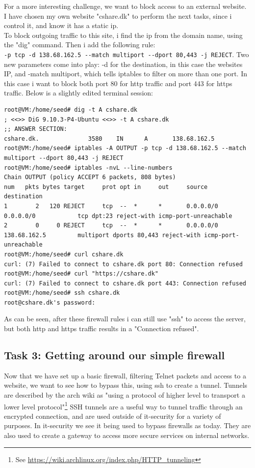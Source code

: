 \documentclass{article}
\begin{document}
For a more interesting challenge, we want to block access to an external website.
I have chosen my own website "cshare.dk" to perform the next tasks, since i control
it, and know it has a static ip.\\
To block outgoing traffic to this site, i find the ip from the domain name, using
the "dig" command. Then i add the following rule:\\
\verb!-p tcp -d 138.68.162.5 --match multiport --dport 80,443 -j REJECT!. Two new
parameters come into play: -d for the destination, in this case the websites IP, and
-match multiport, which tells iptables to filter on more than one port. In this case
i want to block both port 80 for http traffic and port 443 for https traffic. Below
is a slightly edited terminal session:
\begin{verbatim}
root@VM:/home/seed# dig -t A cshare.dk
; <<>> DiG 9.10.3-P4-Ubuntu <<>> -t A cshare.dk
;; ANSWER SECTION:
cshare.dk.              3580    IN      A       138.68.162.5
root@VM:/home/seed# iptables -A OUTPUT -p tcp -d 138.68.162.5 --match multiport --dport 80,443 -j REJECT
root@VM:/home/seed# iptables -nvL --line-numbers
Chain OUTPUT (policy ACCEPT 6 packets, 808 bytes)
num   pkts bytes target     prot opt in     out     source               destination
1        2   120 REJECT     tcp  --  *      *       0.0.0.0/0            0.0.0.0/0            tcp dpt:23 reject-with icmp-port-unreachable
2        0     0 REJECT     tcp  --  *      *       0.0.0.0/0            138.68.162.5         multiport dports 80,443 reject-with icmp-port-unreachable
root@VM:/home/seed# curl cshare.dk
curl: (7) Failed to connect to cshare.dk port 80: Connection refused
root@VM:/home/seed# curl "https://cshare.dk"
curl: (7) Failed to connect to cshare.dk port 443: Connection refused
root@VM:/home/seed# ssh cshare.dk
root@cshare.dk's password:
\end{verbatim}
As can be seen, after these firewall rules i can still use "ssh" to access the server,
but both http and https traffic results in a "Connection refused".\\


\subsection{Task 3: Getting around our simple firewall}
Now that we have set up a basic firewall, filtering Telnet packets and access to
a website, we want to see how to bypass this, using ssh to create a tunnel. 
Tunnels are described by the arch wiki as "using a protocol of higher level 
to transport a lower level protocol"\footnote{See \url{https://wiki.archlinux.org/index.php/HTTP_tunneling}}
SSH tunnels are a useful way to tunnel traffic through an encrypted connection, and
are used outside of it-security for a variety of purposes. In it-security we see
it being used to bypass firewalls as today. They are also used to create a 
gateway to access more secure services on internal networks.\\
\end{document}
